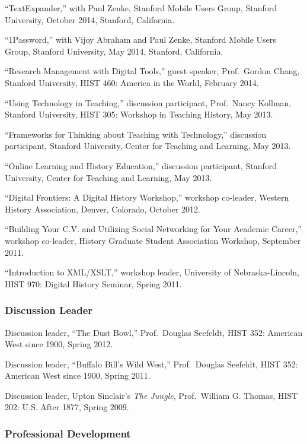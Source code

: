 ``TextExpander,'' with Paul Zenke, Stanford Mobile Users Group, Stanford
University, October 2014, Stanford, California.

``1Password,'' with Vijoy Abraham and Paul Zenke, Stanford Mobile Users
Group, Stanford University, May 2014, Stanford, California.

``Research Management with Digital Tools,'' guest speaker, Prof.~Gordon
Chang, Stanford University, HIST 460: America in the World, February
2014.

``Using Technology in Teaching,'' discussion participant, Prof.~Nancy
Kollman, Stanford University, HIST 305: Workshop in Teaching History,
May 2013.

``Frameworks for Thinking about Teaching with Technology,'' discussion
participant, Stanford University, Center for Teaching and Learning, May
2013.

``Online Learning and History Education,'' discussion participant,
Stanford University, Center for Teaching and Learning, May 2013.

``Digital Frontiers: A Digital History Workshop,'' workshop co-leader,
Western History Association, Denver, Colorado, October 2012.

``Building Your C.V. and Utilizing Social Networking for Your Academic
Career,'' workshop co-leader, History Graduate Student Association
Workshop, September 2011.

``Introduction to XML/XSLT,'' workshop leader, University of
Nebraska-Lincoln, HIST 970: Digital History Seminar, Spring 2011.

\subsubsection{Discussion Leader}\label{discussion-leader}

Discussion leader, ``The Dust Bowl,'' Prof.~Douglas Seefeldt, HIST 352:
American West since 1900, Spring 2012.

Discussion leader, ``Buffalo Bill's Wild West,'' Prof.~Douglas Seefeldt,
HIST 352: American West since 1900, Spring 2011.

Discussion leader, Upton Sinclair's \emph{The Jungle}, Prof.~William G.
Thomas, HIST 202: U.S. After 1877, Spring 2009.

\subsubsection{Professional
Development}\label{professional-development-1}

